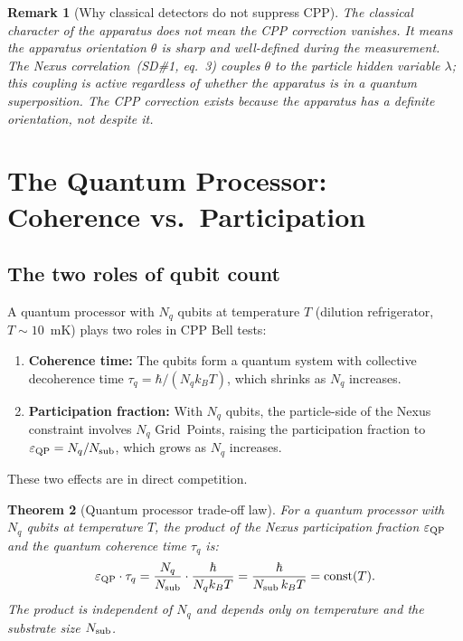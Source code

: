 \documentclass[11pt,a4paper]{article}
\newtheorem{theorem}{Theorem}[section]
\newtheorem{remark}[theorem]{Remark}
\newcommand{\eps}{\varepsilon}
\begin{document}
\begin{remark}[Why classical detectors do not suppress CPP]
The classical character of the apparatus does \emph{not} mean the
CPP correction vanishes.  It means the apparatus orientation $\theta$
is sharp and well-defined during the measurement.  The Nexus
correlation~(SD\#1, eq.~3) couples $\theta$ to the particle hidden
variable $\lambda$; this coupling is active regardless of whether
the apparatus is in a quantum superposition.  The CPP correction
exists \emph{because} the apparatus has a definite orientation,
not despite it.
\end{remark}

\section{The Quantum Processor: Coherence vs.\ Participation}
\label{sec:QP}

\subsection{The two roles of qubit count}

A quantum processor with $N_q$ qubits at temperature $T$ (dilution
refrigerator, $T \sim 10$~mK) plays two roles in CPP Bell tests:

\begin{enumerate}
\item \textbf{Coherence time:} The qubits form a quantum system with
  collective decoherence time $\tau_q = \hbar/(N_q k_B T)$, which
  shrinks as $N_q$ increases.
\item \textbf{Participation fraction:} With $N_q$ qubits, the
  particle-side of the Nexus constraint involves $N_q$ Grid~Points,
  raising the participation fraction to $\eps_{\rm QP} = N_q /
  N_{\rm sub}$, which grows as $N_q$ increases.
\end{enumerate}

These two effects are in direct competition.

\begin{theorem}[Quantum processor trade-off law]
\label{thm:tradeoff}
For a quantum processor with $N_q$ qubits at temperature $T$,
the product of the Nexus participation fraction $\eps_{\rm QP}$
and the quantum coherence time $\tau_q$ is:
\begin{equation}
\eps_{\rm QP} \cdot \tau_q
= \frac{N_q}{N_{\rm sub}} \cdot \frac{\hbar}{N_q k_B T}
= \frac{\hbar}{N_{\rm sub}\, k_B T}
= \mathrm{const}(T).
\label{eq:tradeoff}
\end{equation}
The product is independent of $N_q$ and depends only on temperature
and the substrate size $N_{\rm sub}$.
\end{theorem}
\end{document}
